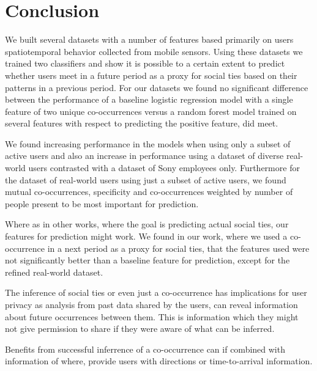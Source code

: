 \chapter{Conclusion}
\label{chap:conclusion}
We built several datasets with a number of features based primarily on users spatiotemporal behavior collected from mobile sensors. Using these datasets we trained two classifiers and show it is possible to a certain extent to predict whether users meet in a future period as a proxy for social ties based on their patterns in a previous period. For our datasets we found no significant difference between the performance of a baseline logistic regression model with a single feature of two unique co-occurrences versus a random forest model trained on several features with respect to predicting the positive feature, did meet.

We found increasing performance in the models when using only a subset of active users and also an increase in performance using a dataset of diverse real-world users contrasted with a dataset of Sony employees only. Furthermore for the dataset of real-world users using just a subset of active users, we found mutual co-occurrences, specificity and co-occurrences weighted by number of people present to be most important for prediction.

Where as in other works, where the goal is predicting actual social ties, our features for prediction might work. We found in our work, where we used a co-occurrence in a next period as a proxy for social ties, that the features used were not significantly better than a baseline feature for prediction, except for the refined real-world dataset.

The inference of social ties or even just a co-occurrence has implications for user privacy as analysis from past data shared by the users, can reveal information about future occurrences between them. This is information which they might not give permission to share if they were aware of what can be inferred.

Benefits from successful inferrence of a co-occurrence can if combined with information of where, provide users with directions or time-to-arrival information.